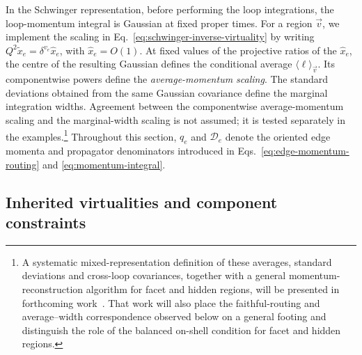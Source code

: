 \documentclass[a4paper,11pt]{article}
\begin{document}
In the Schwinger representation, before performing the loop integrations, the
loop-momentum integral is Gaussian at fixed proper times.  For a region
\(\vec v\), we implement the
scaling in Eq.~\eqref{eq:schwinger-inverse-virtuality} by writing
\(Q^2\widetilde x_e=\delta^{v_e}\widehat x_e\), with
\(\widehat x_e=O(1)\).  At fixed values of the projective ratios of the
\(\widehat x_e\), the centre of the resulting Gaussian defines the conditional
average \(\langle\boldsymbol\ell\rangle_{\vec v}\).  Its
componentwise powers define the \emph{average-momentum scaling}.  The standard
deviations obtained from the same Gaussian covariance define the marginal
integration widths.  Agreement between the componentwise average-momentum
scaling and the marginal-width scaling is not assumed; it is tested separately
in the examples.\footnote{A systematic mixed-representation definition of
these averages, standard deviations and cross-loop covariances, together with
a general momentum-reconstruction algorithm for facet and hidden regions,
will be presented in forthcoming work~\cite{GardiZhu:2026regions}.  That work will
also place the faithful-routing and average--width correspondence observed
below on a general footing and distinguish the role of the balanced on-shell condition
for facet and hidden regions.}
Throughout this section, \(q_e\) and
\(\mathcal D_e\) denote the oriented edge momenta and propagator denominators introduced in
Eqs.~\eqref{eq:edge-momentum-routing} and \eqref{eq:momentum-integral}.

\subsection{Inherited virtualities and component constraints}
\end{document}
